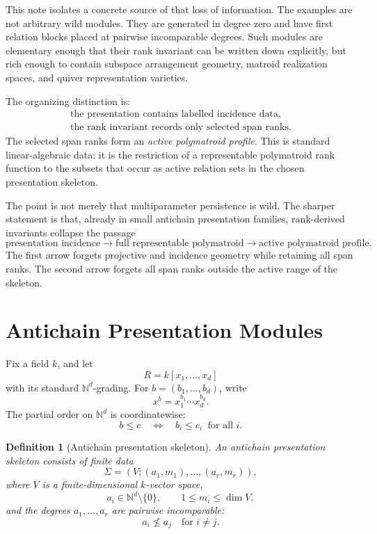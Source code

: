 \documentclass[11pt]{article}
\newtheorem{definition}[theorem]{Definition}
\begin{document}
This note isolates a concrete source of that loss of information. The examples are not arbitrary wild modules. They are generated in degree zero and have first relation blocks placed at pairwise incomparable degrees. Such modules are elementary enough that their rank invariant can be written down explicitly, but rich enough to contain subspace arrangement geometry, matroid realization spaces, and quiver representation varieties.

The organizing distinction is:
\[
\begin{gathered}
\text{the presentation contains labelled incidence data,}\\
\text{the rank invariant records only selected span ranks.}
\end{gathered}
\]
The selected span ranks form an \emph{active polymatroid profile}. This is standard linear-algebraic data: it is the restriction of a representable polymatroid rank function to the subsets that occur as active relation sets in the chosen presentation skeleton.

The point is not merely that multiparameter persistence is wild. The sharper statement is that, already in small antichain presentation families, rank-derived invariants collapse the passage
\[
\text{presentation incidence}
\longrightarrow
\text{full representable polymatroid}
\longrightarrow
\text{active polymatroid profile}.
\]
The first arrow forgets projective and incidence geometry while retaining all span ranks. The second arrow forgets all span ranks outside the active range of the skeleton.

\section{Antichain Presentation Modules}

Fix a field \(k\), and let
\[
R=k[x_1,\ldots,x_d]
\]
with its standard \(\mathbb N^d\)-grading. For \(b=(b_1,\ldots,b_d)\), write
\[
x^b=x_1^{b_1}\cdots x_d^{b_d}.
\]
The partial order on \(\mathbb N^d\) is coordinatewise:
\[
b\le c
\quad\Longleftrightarrow\quad
b_i\le c_i\ \text{ for all }i.
\]

\begin{definition}[Antichain presentation skeleton]
An antichain presentation skeleton consists of finite data
\[
\Sigma=(V;(a_1,m_1),\ldots,(a_r,m_r)),
\]
where \(V\) is a finite-dimensional \(k\)-vector space,
\[
a_i\in\mathbb N^d\setminus\{0\},
\qquad
1\le m_i\le \dim V,
\]
and the degrees \(a_1,\ldots,a_r\) are pairwise incomparable:
\[
a_i\not\le a_j
\quad
\text{for }i\ne j.
\]
\end{definition}
\end{document}
